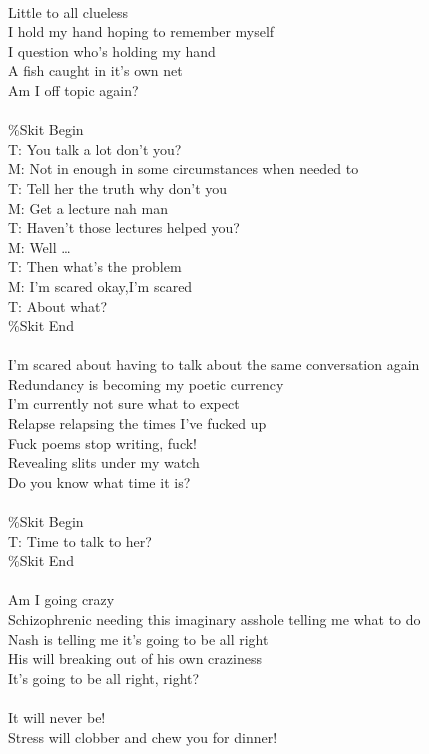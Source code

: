 \documentclass[12pt, b5paper, oneside]{book}
\begin{document}
\\Little to all clueless
\\I hold my hand hoping to remember myself
\\I question who's holding my hand
\\A fish caught in it's own net
\\Am I off topic again?
%
\\\\\%Skit Begin
\\T: You talk a lot don't you?
\\M: Not in enough in some circumstances when needed to
\\T: Tell her the truth why don't you
\\M: Get a lecture nah man
\\T: Haven't those lectures helped you?
\\M: Well \dots 
\\T: Then what's the problem
\\M: I'm scared okay,I'm scared
\\T: About what?
\\\%Skit End
%
\\\\I'm scared about having to talk about the same conversation again
\\Redundancy is becoming my poetic currency
\\I'm currently not sure what to expect
\\Relapse relapsing the times I've fucked up
\\Fuck poems stop writing, fuck!
\\Revealing slits under my watch
\\Do you know what time it is?
%
\\\\\%Skit Begin
\\T: Time to talk to her?
\\\%Skit End
%
\\\\Am I going crazy
\\Schizophrenic needing this imaginary asshole telling me what to do
\\Nash is telling me it's going to be all right 
\\His will breaking out of his own craziness 
\\It's going to be all right, right?
%
\\\\It will never be!
\\Stress will clobber and chew you for dinner!
\end{document}
